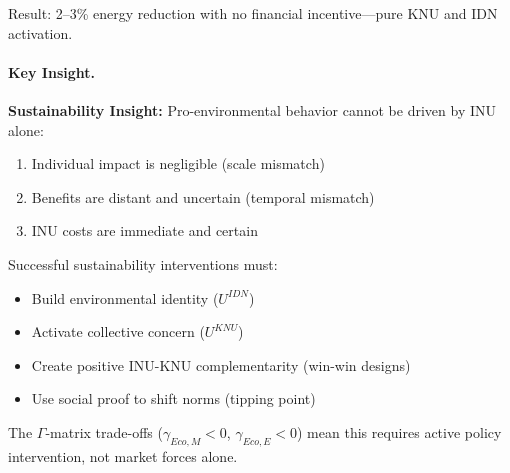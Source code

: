 Result: 2--3\% energy reduction with no financial incentive---pure
KNU and IDN activation.

\paragraph{Key Insight.}
\begin{tcolorbox}[colback=yellow!10!white, colframe=yellow!50!black]
\textbf{Sustainability Insight:}
Pro-environmental behavior cannot be driven by INU alone:
\begin{enumerate}
\item Individual impact is negligible (scale mismatch)
\item Benefits are distant and uncertain (temporal mismatch)
\item INU costs are immediate and certain
\end{enumerate}
Successful sustainability interventions must:
\begin{itemize}
\item Build environmental identity ($U^{IDN}$)
\item Activate collective concern ($U^{KNU}$)
\item Create positive INU-KNU complementarity (win-win designs)
\item Use social proof to shift norms (tipping point)
\end{itemize}
The $\Gamma$-matrix trade-offs ($\gamma_{Eco,M} < 0$, $\gamma_{Eco,E} < 0$) 
mean this requires active policy intervention, not market forces alone.
\end{tcolorbox}

